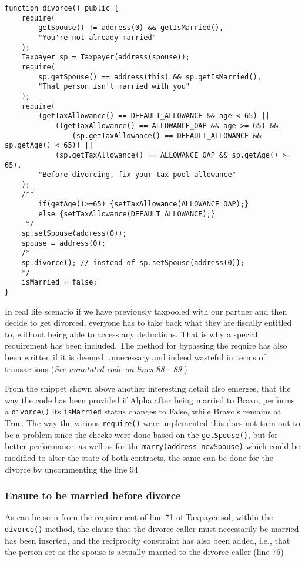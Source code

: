 \documentclass{article}
\begin{document}
\begin{verbatim}
function divorce() public {
    require(
        getSpouse() != address(0) && getIsMarried(),
        "You're not already married"
    );
    Taxpayer sp = Taxpayer(address(spouse));
    require(
        sp.getSpouse() == address(this) && sp.getIsMarried(),
        "That person isn't married with you"
    );
    require(
        (getTaxAllowance() == DEFAULT_ALLOWANCE && age < 65) ||
            ((getTaxAllowance() == ALLOWANCE_OAP && age >= 65) &&
                (sp.getTaxAllowance() == DEFAULT_ALLOWANCE && sp.getAge() < 65)) ||
            (sp.getTaxAllowance() == ALLOWANCE_OAP && sp.getAge() >= 65),
        "Before divorcing, fix your tax pool allowance"
    ); 
    /**
        if(getAge()>=65) {setTaxAllowance(ALLOWANCE_OAP);}
        else {setTaxAllowance(DEFAULT_ALLOWANCE);}
     */
    sp.setSpouse(address(0));
    spouse = address(0);
    /*
    sp.divorce(); // instead of sp.setSpouse(address(0));
    */
    isMarried = false;
}
\end{verbatim}
In real life scenario if we have previously taxpooled with our partner and then decide to get divorced, everyone has to take back what they are fiscally entitled to, without being able to access any deductions. That is why a special requirement has been included. The method for bypassing the require has also been written if it is deemed unnecessary and indeed wasteful in terms of transactions (\textit{See annotated code on lines 88 - 89.})

From the snippet shown above another interesting detail also emerges, that the way the code has been provided if Alpha after being married to Bravo, performs a \texttt{divorce()} its \texttt{isMarried} status changes to False, while Bravo's remains at True. The way the various \texttt{require()} were implemented this does not turn out to be a problem since the checks were done based on the \texttt{getSpouse()}, but for better performance, as well as for the \texttt{marry(address newSpouse)} which could be modified to alter the state of both contracts, the same can be done for the divorce by uncommenting the line 94
\subsubsection{Ensure to be married before divorce}
As can be seen from the requirement of line 71 of Taxpayer.sol, within the \texttt{divorce()} method, the clause that the divorce caller must necessarily be married has been inserted, and the reciprocity constraint has also been added, i.e., that the person set as the spouse is actually married to the divorce caller (line 76)
\end{document}
